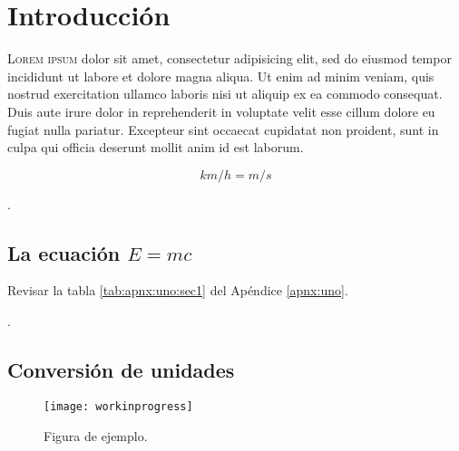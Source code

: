 
\chapter{Introducción}
\lettrine[lines=3]{L}{orem ipsum} dolor sit amet, consectetur adipisicing elit, sed do eiusmod tempor incididunt ut labore et dolore magna aliqua. Ut enim ad minim veniam, quis nostrud exercitation ullamco laboris nisi ut aliquip ex ea commodo consequat. Duis aute irure dolor in reprehenderit in voluptate velit esse cillum dolore eu fugiat nulla pariatur. Excepteur sint occaecat cupidatat non proident, sunt in culpa qui officia deserunt mollit anim id est laborum\citep{ejemplo01}.


\begin{equation*}
  \si{km\per h = m\per s}
\end{equation*}

\lipsum[2]\cite{ejemplo02}.

\section{La ecuación \texorpdfstring{$E=mc$}{E=mc}}
\lipsum[3]

\lipsum[4] Revisar la tabla \ref{tab:apnx:uno:sec1} del Apéndice \ref{apnx:uno}.

\lipsum[5-6]\citep{Dan,Baz}.

\section{Conversión de unidades}%
\lipsum[7]

\begin{figure}[!h]
  \center
  \texttt{[image: workinprogress]}
  \caption{Figura de ejemplo.}
  \label{fig:ejemplo1}
\end{figure}

\lipsum[8-9]

